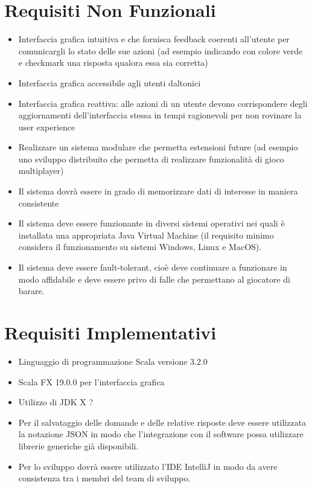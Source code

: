 	\section{Requisiti Non Funzionali}
        \begin{itemize}
            \item Interfaccia grafica intuitiva e che fornisca feedback coerenti all'utente per comunicargli lo stato delle sue azioni (ad esempio indicando con colore verde e checkmark una risposta qualora essa sia corretta)
            \item Interfaccia grafica accessibile agli utenti daltonici
            \item Interfaccia grafica reattiva: alle azioni di un utente devono corrispondere degli aggiornamenti dell'interfaccia stessa in tempi ragionevoli per non rovinare la user experience
            \item Realizzare un sistema modulare che permetta estensioni future (ad esempio uno sviluppo distribuito che permetta di realizzare funzionalità di gioco multiplayer)
            \item Il sistema dovrà essere in grado di memorizzare dati di interesse in maniera consistente
            \item Il sistema deve essere funzionante in diversi sistemi operativi nei quali è installata una appropriata Java Virtual Machine (il requisito minimo considera il funzionamento su sistemi Windows, Linux e MacOS).
            \item Il sistema deve essere fault-tolerant, cioè deve continuare a funzionare in modo affidabile e deve essere privo di falle che permettano al giocatore di barare.
        
        \end{itemize}

\section{Requisiti Implementativi}
        \begin{itemize}
            \item Linguaggio di programmazione Scala versione 3.2.0
            \item Scala FX 19.0.0 per l'interfaccia grafica
            \item Utilizzo di JDK X ?
            \item Per il salvataggio delle domande e delle relative risposte deve essere utilizzata la notazione JSON in modo che l'integrazione con il software possa utilizzare librerie generiche già disponibili.
            \item Per lo sviluppo dovrà essere utilizzato l'IDE IntelliJ in modo da avere consistenza tra i membri del team di sviluppo.
        \end{itemize}

	